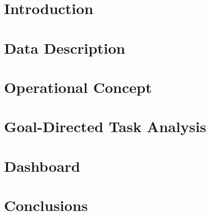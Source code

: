 \documentclass[11pt]{report}
\begin{document}


\tableofcontents

\chapter[Introduction]{Introduction}\label{ch:introduction}


\chapter[Data Description]{Data Description}\label{ch:data-description}


\chapter[Operational Concept]{Operational Concept}\label{ch:operationalconcept}


\chapter[Goal-Directed Task Analysis]{Goal-Directed Task Analysis}\label{ch:gdta}


\chapter[Dashboard]{Dashboard}\label{ch:dashboard}


\chapter[Conclusions]{Conclusions}\label{ch:conclusions}



\setcounter{page}{1}


\listoffigures
\listoftables
\end{document}
